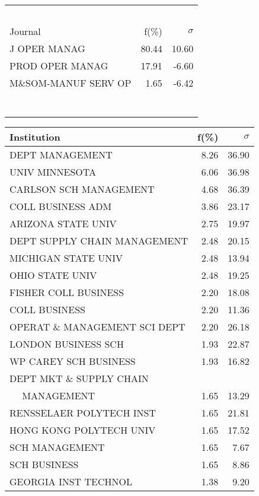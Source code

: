 \documentclass[a4paper,11pt]{report}
\begin{document}
\begin{landscape}
\begin{table}[!ht]
{\begin{tabular}{|l r  r|}
 &  & \\
 &  & \\
 &  & \\
 &  & \\
 &  & \\
\hline
\hline
Journal & f(\%) & $\sigma$\\
\hline
J OPER MANAG & 80.44 & 10.60\\
PROD OPER MANAG & 17.91 & -6.60\\
M\&SOM-MANUF SERV OP & 1.65 & -6.42\\
 &  & \\
 &  & \\
 &  & \\
 &  & \\
 &  & \\
 &  & \\
 &  & \\
\hline
\end{tabular}
}
{\scriptsize\begin{tabular}{|l r r|}
\hline
Institution & f(\%) & $\sigma$\\
\hline
DEPT MANAGEMENT & 8.26 & 36.90\\
UNIV MINNESOTA & 6.06 & 36.98\\
CARLSON SCH MANAGEMENT & 4.68 & 36.39\\
COLL BUSINESS ADM & 3.86 & 23.17\\
ARIZONA STATE UNIV & 2.75 & 19.97\\
DEPT SUPPLY CHAIN MANAGEMENT & 2.48 & 20.15\\
MICHIGAN STATE UNIV & 2.48 & 13.94\\
OHIO STATE UNIV & 2.48 & 19.25\\
FISHER COLL BUSINESS & 2.20 & 18.08\\
COLL BUSINESS & 2.20 & 11.36\\
OPERAT \& MANAGEMENT SCI DEPT & 2.20 & 26.18\\
LONDON BUSINESS SCH & 1.93 & 22.87\\
WP CAREY SCH BUSINESS & 1.93 & 16.82\\
DEPT MKT \& SUPPLY CHAIN &  & \\
$\quad$ MANAGEMENT & 1.65 & 13.29\\
RENSSELAER POLYTECH INST & 1.65 & 21.81\\
HONG KONG POLYTECH UNIV & 1.65 & 17.52\\
SCH MANAGEMENT & 1.65 & 7.67\\
SCH BUSINESS & 1.65 & 8.86\\
GEORGIA INST TECHNOL & 1.38 & 9.20\\

\end{tabular}}
\end{table}
\end{landscape}
\end{document}

